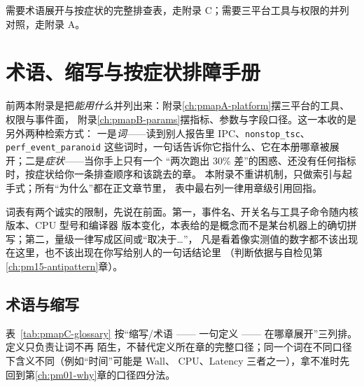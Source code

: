 \documentclass[12pt,a4paper,fontset=fandol]{ctexbook}
\newcommand{\Tp}[1]{\texttt{#1}}
\newcommand{\Bk}{\discretionary{}{}{}}
\newcommand{\Lang}[1]{\textsf{#1}}
\newcommand{\MWall}{\Lang{Wall}}
\newcommand{\MCpu}{\Lang{CPU}}
\newcommand{\MLat}{\Lang{Latency}}
\newcommand{\Mx}[1]{\textsf{#1}}
\begin{document}
需要术语展开与按症状的完整排查表，走附录 C；需要三平台工具与权限的并列对照，走附录 A。

\chapter{术语、缩写与按症状排障手册}
\label{ch:pmapC-glossary}

前两本附录是把\emph{能用什么}并列出来：附录\ref{ch:pmapA-platform}摆三平台的工具、权限与事件面，
附录\ref{ch:pmapB-params}摆指标、参数与字段口径。这一本收的是另外两种检索方式：
一是\emph{词}——读到别人报告里 \Mx{IPC}、\Tp{nonstop\_{\Bk}tsc}、\Tp{perf\_event\_{\Bk}paranoid}
这些词时，一句话告诉你它指什么、它在本册哪章被展开；二是\emph{症状}——当你手上只有一个
``两次跑出 30\% 差''的困惑、还没有任何指标时，按症状给你一条排查顺序和该跳去的章。
本附录不重讲机制，只做索引与起手式；所有``为什么''都在正文章节里，
表中最右列一律用章级引用回指。

词表有两个诚实的限制，先说在前面。第一，事件名、开关名与工具子命令随内核版本、CPU 型号和编译器
版本变化，本表给的是概念而不是某台机器上的确切拼写；第二，量级一律写成区间或``取决于…''，
凡是看着像实测值的数字都不该出现在这里，也不该出现在你写给别人的一句话结论里
（判断依据与自检见第\ref{ch:pm15-antipattern}章）。

\section{术语与缩写}
\label{sec:pmapC-glossary}

表~\ref{tab:pmapC-glossary} 按``缩写/术语 —— 一句定义 —— 在哪章展开''三列排。定义只负责让词不再
陌生，不替代定义所在章的完整口径；同一个词在不同口径下含义不同（例如``时间''可能是 \MWall{}、
\MCpu{}、\MLat{} 三者之一），拿不准时先回到第\ref{ch:pm01-why}章的口径四分法。
\end{document}
